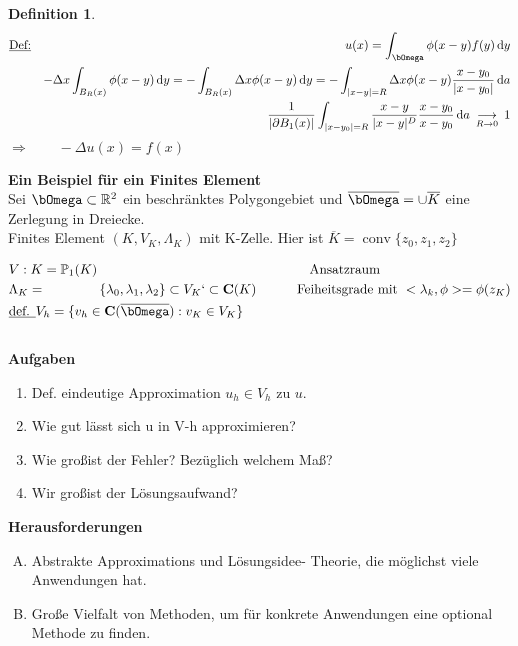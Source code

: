 \documentclass[12pt,twoside,reqno]{article}
\newcommand{\dy}{\,\mathrm{d}y}
\newcommand{\da}{\,\mathrm{d}a}
\newcommand\conv{\operatorname*{conv}}
\renewcommand{\Omega}{\bOmega}
\newcommand\bC{\mathbf{C}}
\newcommand{\R}{\mathbb{R}}
\renewcommand{\P}{\mathbb{P}}
\theoremstyle{TheoWieners}
\newtheorem{Definition}[theow]{Definition}
\theoremstyle{break}
\theoremstyle{app}
\newtheorem{Spezielle Lösungen}[app]{Spezielle Lösungen}
\newtheorem{Spezielle Lösungen der Poisson-Gleichung}[app]{Spezielle Lösungen der Poisson-Gleichung}
\newtheorem{Kartesische Gitter in 2-d}[app]{Kartesische Gitter in 2-d}
\newtheorem{Diskretisierungen hoher Ordnung}[app]{Diskretisierungen hoher Ordnung}
\newtheorem{Zyklische Reduktion}[app]{Zyklische Reduktion}
\begin{document}
\begin{Definition}
    \begin{eqnarray*}
    \underline{\text{Def:}} &&u(x) = \int_{\Omega} \phi (x-y) f(y) \dy \\
    &&-\Delta x \int_{B_R (x)}\phi(x-y) \dy = -  \int_{B_R (x)} \Delta x\phi(x-y) \dy = -  \int_{|x-y|=R} \Delta x\phi(x-y) \frac{x-y_0}{|x-y_0|} \da\\
    &&\frac{1}{|\partial B_1 (x)|}\int_{|x-y_0|=R} \frac{x-y}{|x-y|^D} \frac{x-y_0}{x-y_0} \da  \ \mathop{\mathrm{\longrightarrow}}\limits_{R \rightarrow 0} \ 1
    \end{eqnarray*}
  $  \Longrightarrow \qquad - \Delta u(x)= f(x)$
  \end{Definition}

\textbf{Ein Beispiel für ein Finites Element} \\
Sei $\Omega \subset \R^2$ ein beschränktes Polygongebiet und $\overline\Omega = \cup \overline{K}$ eine Zerlegung in Dreiecke. \\
Finites Element $(K,V_K,\Lambda_K)$ mit K-Zelle. Hier ist $\overline{K}= \conv\{ z_0, z_1, z_2\}$

 \begin{align*}
        &V:K = \P_1(K)   && \qquad \qquad \text{Ansatzraum} \\
        &\Lambda_K=\span\{ \lambda_0, \lambda_1, \lambda_2\} \subset V_K`\subset \bC(K) && \hspace{-2.55cm}\text{Feiheitsgrade mit}\  <\lambda_k,\phi>=\phi(z_K) \\
        &\underline{\text{def. }} V_h = \{ v_h \in \bC(\overline{\Omega}) : v_K \in V_K\}
            \end{align*}
            \\
            
            
            
            \textbf{Aufgaben}
\begin{enumerate}[1)]
  \item Def. eindeutige Approximation $u_h \in V_h$ zu $u$.
      \item Wie gut lässt sich u in V-h approximieren?
      \item Wie gro\ss ist der Fehler? Bezüglich welchem Ma\ss ?
      \item Wir gro\ss ist der Lösungsaufwand?
      \end{enumerate}

            \textbf{Herausforderungen}
\begin{enumerate}[A)]
  \item Abstrakte Approximations und Lösungsidee- Theorie, die möglichst viele Anwendungen hat.
      \item Gro\ss e Vielfalt von Methoden, um für konkrete Anwendungen eine optional Methode zu finden.
     
          \end{enumerate}
          
\end{document}
